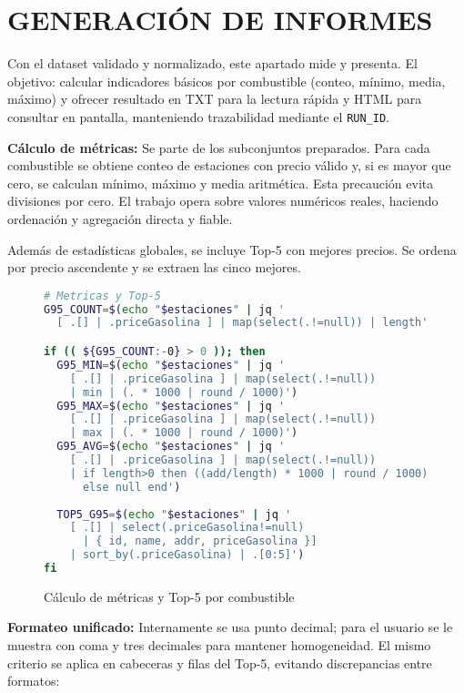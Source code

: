 \chapter{GENERACIÓN DE INFORMES}

Con el dataset validado y normalizado, este apartado mide y presenta. El objetivo: calcular indicadores básicos por combustible (conteo, mínimo, media, máximo) y ofrecer resultado en TXT para la lectura rápida y HTML para consultar en pantalla, manteniendo trazabilidad mediante el \texttt{RUN\_ID}.

\textbf{Cálculo de métricas:} Se parte de los subconjuntos preparados. Para cada combustible se obtiene conteo de estaciones con precio válido y, si es mayor que cero, se calculan mínimo, máximo y media aritmética. Esta precaución evita divisiones por cero. El trabajo opera sobre valores numéricos reales, haciendo ordenación y agregación directa y fiable.

Además de estadísticas globales, se incluye Top-5 con mejores precios. Se ordena por precio ascendente y se extraen las cinco mejores.

\begin{figure}[H]
  \footnotesize
  \begin{lstlisting}[language=bash]
# Metricas y Top-5
G95_COUNT=$(echo "$estaciones" | jq '
  [ .[] | .priceGasolina ] | map(select(.!=null)) | length')

if (( ${G95_COUNT:-0} > 0 )); then
  G95_MIN=$(echo "$estaciones" | jq '
    [ .[] | .priceGasolina ] | map(select(.!=null)) 
    | min | (. * 1000 | round / 1000)')
  G95_MAX=$(echo "$estaciones" | jq '
    [ .[] | .priceGasolina ] | map(select(.!=null)) 
    | max | (. * 1000 | round / 1000)')
  G95_AVG=$(echo "$estaciones" | jq '
    [ .[] | .priceGasolina ] | map(select(.!=null)) 
    | if length>0 then ((add/length) * 1000 | round / 1000) 
      else null end')
  
  TOP5_G95=$(echo "$estaciones" | jq '
    [ .[] | select(.priceGasolina!=null)
      | { id, name, addr, priceGasolina }]
    | sort_by(.priceGasolina) | .[0:5]')
fi
\end{lstlisting}
  \caption{Cálculo de métricas y Top-5 por combustible}
\end{figure}

\textbf{Formateo unificado:} Internamente se usa punto decimal; para el usuario se le muestra con coma y tres decimales para mantener homogeneidad. El mismo criterio se aplica en cabeceras y filas del Top-5, evitando discrepancias entre formatos:

